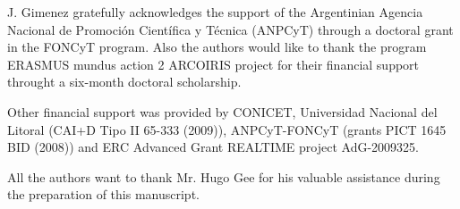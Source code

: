 \documentclass[review]{elsarticle}
\begin{document}
J. Gimenez gratefully acknowledges the support of the Argentinian Agencia Nacional de Promoci\'on Cient\'ifica y T\' ecnica (ANPCyT) through a doctoral grant in the FONCyT program. Also the authors would like to thank the program ERASMUS mundus action 2 ARCOIRIS project for their financial support throught a six-month doctoral scholarship.

Other financial support was provided by CONICET, Universidad Nacional del Litoral (CAI+D Tipo II 65-333 (2009)), ANPCyT-FONCyT (grants PICT 1645 BID (2008)) and ERC Advanced Grant REALTIME project AdG-2009325.

All the authors want to thank Mr. Hugo Gee for his valuable assistance during the preparation of this manuscript.



\end{document}
